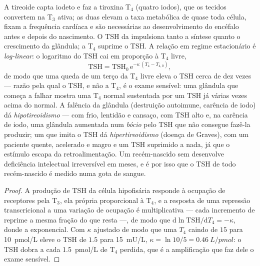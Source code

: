 \begin{proposition}\label{prop:b3:endocrinology:thyroid}
A tireoide capta iodeto e faz a tiroxina T$_{4}$ (quatro iodos), que os
tecidos convertem na T$_{3}$ ativa; as duas elevam a taxa metabólica de
quase toda célula, fixam a frequência cardíaca e são necessárias ao
desenvolvimento do encéfalo antes e depois do nascimento. O TSH da
 impulsiona tanto a síntese quanto o crescimento da glândula; a
T$_{4}$ suprime o TSH. A relação em regime estacionário é
\emph{log-linear}: o logaritmo do TSH cai em proporção à T$_{4}$ livre,
\[
\text{TSH} = \text{TSH}_{0}\,\mathrm{e}^{-\kappa\,(T_{4} - T_{4,0})},
\]
de modo que uma queda de um terço da T$_{4}$ livre eleva o TSH cerca de
dez vezes --- razão pela qual o TSH, e não a T$_{4}$, é o exame
sensível: uma glândula que começa a falhar mostra uma T$_{4}$ normal
sustentada por um TSH já várias vezes acima do normal. A falência da
glândula (destruição autoimune, carência de iodo) dá
\emph{hipotireoidismo} --- com frio, lentidão e cansaço, com TSH alto e,
na carência de iodo, uma glândula aumentada num \emph{bócio} pelo TSH
que não consegue fazê-la produzir; um  que imita o TSH dá
\emph{hipertireoidismo} (doença de Graves), com um paciente quente,
acelerado e magro e um TSH suprimido a nada, já que o estímulo escapa da
retroalimentação. Um recém-nascido sem  desenvolve
deficiência intelectual irreversível em meses, e é por isso que o TSH de
todo recém-nascido é medido numa gota de sangue.
\end{proposition}
\begin{proof}
A produção de TSH da célula hipofisária responde à ocupação de
receptores pela T$_{3}$, ela própria proporcional à T$_{4}$, e a
resposta de uma repressão transcricional a uma variação de ocupação é
multiplicativa --- cada incremento de  reprime a mesma fração do
que resta ---, de modo que $\mathrm{d}\ln\text{TSH}/\mathrm{d}T_{4} = -\kappa$, donde a exponencial. Com $\kappa$ ajustado de modo que uma
$T_{4}$ caindo de $15$ para \qty{10}{pmol/L} eleve o TSH de $1.5$ para
\qty{15}{mU/L}, $\kappa = \ln 10/5 = \qty{0.46}{L/pmol}$: o TSH dobra a
cada \qty{1.5}{pmol/L} de T$_{4}$ perdida, que é a amplificação que faz
dele o exame sensível.
\end{proof}

